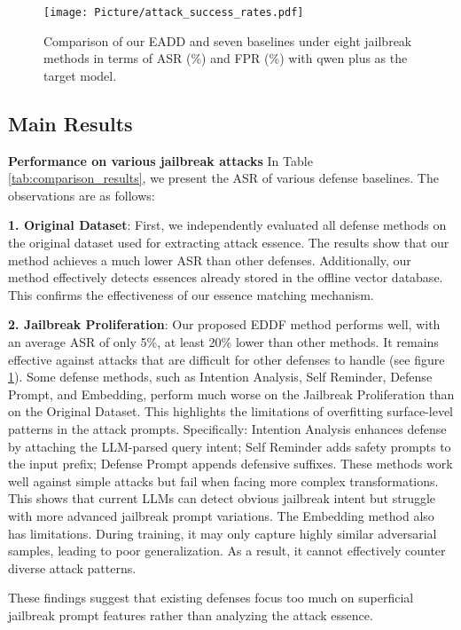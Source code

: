\begin{figure}[ht] 
    \centering
    \texttt{[image: Picture/attack\_success\_rates.pdf]} 
    \caption{ Comparison of our EADD and seven baselines under eight jailbreak methods in terms of ASR (\%) and FPR (\%) with qwen plus as the target model.}
    \label{fig_method}
\end{figure}


\subsection{Main Results}
\textbf{Performance on various jailbreak attacks} In Table \ref{tab:comparison_results}, we present the ASR of various defense baselines. The observations are as follows:

\textbf{1. Original Dataset}: First, we independently evaluated all defense methods on the original dataset used for extracting attack essence. The results show that our method achieves a much lower ASR than other defenses. Additionally, our method effectively detects essences already stored in the offline vector database. This confirms the effectiveness of our essence matching mechanism.

\textbf{2. Jailbreak Proliferation}: Our proposed EDDF method performs well, with an average ASR of only 5\%, at least 20\% lower than other methods. It remains effective against attacks that are difficult for other defenses to handle (see figure \ref{fig_method}).
Some defense methods, such as Intention Analysis, Self Reminder, Defense Prompt, and Embedding, perform much worse on the Jailbreak Proliferation than on the Original Dataset. This highlights the limitations of overfitting surface-level patterns in the attack prompts. Specifically: Intention Analysis enhances defense by attaching the LLM-parsed query intent; Self Reminder adds safety prompts to the input prefix; Defense Prompt appends defensive suffixes. These methods work well against simple attacks but fail when facing more complex transformations. This shows that current LLMs can detect obvious jailbreak intent but struggle with more advanced jailbreak prompt variations. The Embedding method also has limitations. During training, it may only capture highly similar adversarial samples, leading to poor generalization. As a result, it cannot effectively counter diverse attack patterns.


These findings suggest that existing defenses focus too much on superficial jailbreak prompt features rather than analyzing the attack essence.

